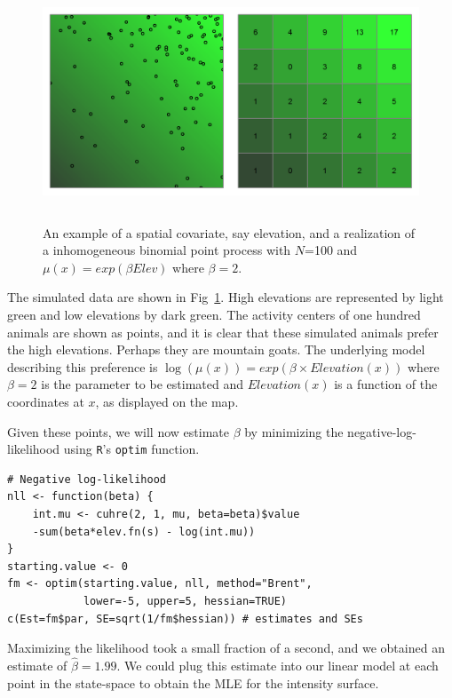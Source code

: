\begin{figure}
\centering
\includegraphics[width=5in,height=2.5in]{Ch11/figs/heteroPlots}
\label{ch9:fig:hetero}
\caption{An example of a spatial covariate, say elevation, and a
  realization of a inhomogeneous binomial point process with $N$=100
  and $\mu(x) = exp(\beta Elev)$ where $\beta=2$.}
\end{figure}

The simulated data are shown in Fig~\ref{ch9:fig:hetero}. High elevations
are represented by light green and low elevations by dark green. The
activity centers of one hundred animals are shown as
points, and it is clear that these simulated animals prefer the high
elevations.  Perhaps they are mountain goats. The underlying model describing this preference is
$\log(\mu(x)) = exp(\beta \times Elevation(x))$
where $\beta=2$ is the parameter to be estimated and $Elevation(x)$
is a function of the coordinates at $x$, as displayed on the map.

Given these points, we will now estimate $\beta$ by minimizing the
negative-log-likelihood using \verb+R+'s \verb+optim+ function.

\begin{small}
\begin{verbatim}
# Negative log-likelihood
nll <- function(beta) {
    int.mu <- cuhre(2, 1, mu, beta=beta)$value
    -sum(beta*elev.fn(s) - log(int.mu))
}
starting.value <- 0
fm <- optim(starting.value, nll, method="Brent",
            lower=-5, upper=5, hessian=TRUE)
c(Est=fm$par, SE=sqrt(1/fm$hessian)) # estimates and SEs
\end{verbatim}
\end{small}


Maximizing the likelihood took a small fraction of a second, and we
obtained an estimate of $\hat{\beta}=1.99$. We could plug
this estimate into our linear model at each point in the state-space to
obtain the MLE for the intensity surface.

